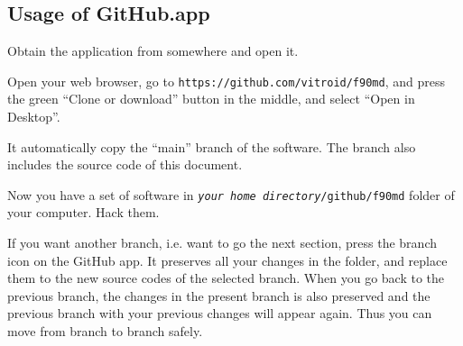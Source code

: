 \subsection{Usage of GitHub.app}
Obtain the application from somewhere and open it.

Open your web browser, go to {\tt https://github.com/vitroid/f90md}, and
press the green ``Clone or download'' button in the middle, and select
``Open in Desktop''.

It automatically copy the ``main'' branch of the software.
The branch also includes the source code of this document.

Now you have a set of software in {\tt {\it your home directory}/github/f90md} folder of your
computer. Hack them.

If you want another branch, i.e. want to go the next section, press the branch
icon on the GitHub app.  It preserves all your changes in the folder,
and replace them to the new source codes of the selected branch.  When
you go back to the previous branch, the changes in the present branch
is also preserved and the previous branch with your previous changes
will appear again.  Thus you can move from branch to branch safely.
